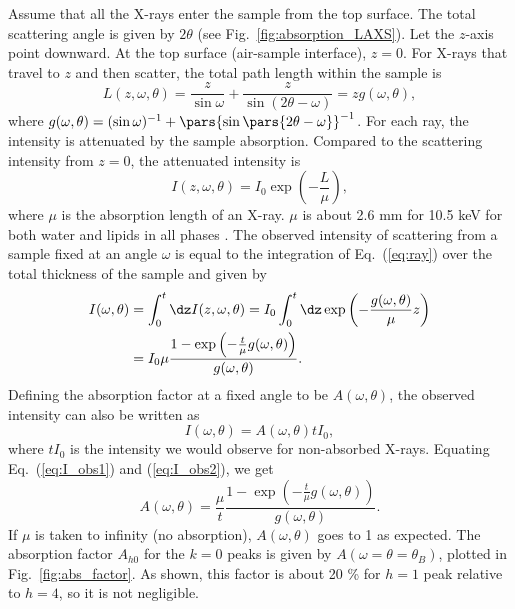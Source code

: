 Assume that all the X-rays enter the sample from the top surface. The total scattering
angle is given by $2\theta$ (see Fig.~\ref{fig:absorption_LAXS}).
Let the $z$-axis point downward. At the top surface
(air-sample interface), $z=0$. For X-rays that travel to $z$ and then scatter, the
total path length within the sample is 
\begin{equation}
  L(z,\omega,\theta) 
  = \frac{z}{\sin\omega}+\frac{z}{\sin(2\theta-\omega)} 
  = zg(\omega,\theta),
\end{equation}
where $g(\omega,\theta)=(\sin\omega)^{-1}+\pars{\sin\pars{2\theta-\omega}}^{-1}$.
For each ray, the intensity is attenuated by the sample absorption. 
Compared to the scattering intensity from $z=0$, the attenuated intensity is
\begin{equation}
  I(z,\omega,\theta) = I_0\exp\left(-\frac{L}{\mu}\right),
  \label{eq:ray}
\end{equation}
where $\mu$ is the absorption length of an X-ray. $\mu$ is about 2.6 mm for 
10.5 keV
for both water and lipids in all phases \cite{ref:cxro}.
The observed intensity of scattering from a sample fixed at an angle $\omega$ 
is equal to the integration
of Eq.~(\ref{eq:ray}) over the total thickness of the sample and given by
\begin{align}
  I(\omega,\theta) 
    &= \int_0^t \dz I(z,\omega,\theta)
     = I_0\int_0^t\dz \exp\left(-\frac{g(\omega,\theta)}{\mu}z\right) \nonumber \\
    &= I_0\mu \frac{1-\exp\left(-\frac{t}{\mu}g(\omega,\theta)\right)}{g(\omega,\theta)}.
    \label{eq:I_obs1}
\end{align}
Defining the absorption factor at a fixed angle to be $A(\omega,\theta)$, 
the observed intensity can also be written as
\begin{equation}
  I(\omega,\theta)=A(\omega,\theta)tI_0,
  \label{eq:I_obs2}
\end{equation}
where $tI_0$ is the intensity we would observe for non-absorbed X-rays.
Equating Eq.~(\ref{eq:I_obs1}) and (\ref{eq:I_obs2}), we get
\begin{equation}
  A(\omega,\theta) = \frac{\mu}{t} 
                     \frac{1-\exp\left(-\frac{t}{\mu}g(\omega,\theta)\right)}{g(\omega,\theta)}.
  \label{eq:ang_abs_factor}
\end{equation}
If $\mu$ is taken to infinity (no absorption), $A(\omega,\theta)$ 
goes to 1 as expected.
The absorption factor $A_{h0}$ for the $k=0$ peaks is given by
$A(\omega=\theta=\theta_B)$, plotted in Fig.~\ref{fig:abs_factor}.
As shown, this factor is about 20 \% for $h=1$ peak relative to
$h=4$, so it is not negligible.

